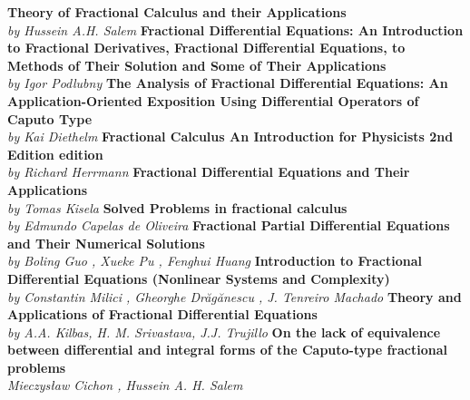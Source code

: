 \newpage
\begin{thebibliography}{9}
     \textbf{Theory of Fractional Calculus and their Applications} 
    \\\textit{by Hussein A.H. Salem}
     \textbf{Fractional Differential Equations: An Introduction to Fractional Derivatives, Fractional Differential Equations, to Methods of Their Solution and Some of Their Applications }
    \\\textit{by Igor Podlubny}
     \textbf{The Analysis of Fractional Differential Equations: An Application-Oriented Exposition Using Differential Operators of Caputo Type}
    \\\textit{by Kai Diethelm}
     \textbf{Fractional Calculus An Introduction for Physicists 2nd Edition edition} 
    \\\textit{by Richard Herrmann}
     \textbf{Fractional Differential Equations and Their Applications}
    \\\textit{by Tomas Kisela}
     \textbf{Solved Problems in fractional calculus}
    \\\textit{by Edmundo Capelas de Oliveira}
     \textbf{Fractional Partial Differential Equations and Their Numerical Solutions }
    \\\textit{by Boling Guo , Xueke Pu , Fenghui Huang}
     \textbf{Introduction to Fractional Differential Equations (Nonlinear Systems and Complexity) }
    \\\textit{by Constantin Milici , Gheorghe Drăgănescu , J. Tenreiro Machado}
     \textbf{Theory and Applications of Fractional Differential Equations }
    \\\textit{by A.A. Kilbas, H. M. Srivastava, J.J. Trujillo}
     \textbf{On the lack of equivalence between differential and integral forms of the Caputo-type fractional problems}
    \\\textit{Mieczysław Cichon , Hussein A. H. Salem}
    
\end{thebibliography}
\newpage